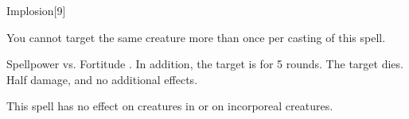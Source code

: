 \begin{spellsection}{Implosion}[9]
    \begin{spellheader}
    \end{spellheader}
    \begin{spellcontent}
        \begin{spelltargetinginfo}
            \spellspecial You cannot target the same creature more than once per casting of this spell.
        \end{spelltargetinginfo}
        \begin{spelleffects}
            \begin{spellattack}{Spellpower vs. Fortitude}
                \spellsuccess {}. In addition, the target is \staggered for 5 rounds.
                \spellcritical The target dies.
                \spellfailure Half damage, and no additional effects.
            \end{spellattack}
        \end{spelleffects}
    \end{spellcontent}
    \begin{spellfooter}
        \spellnotes This spell has no effect on creatures in  or on incorporeal creatures.
        \miscastexplode
    \end{spellfooter}
\end{spellsection}

